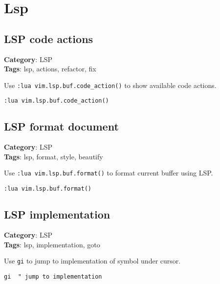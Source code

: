 {{{{{{\chapter{Lsp}
\section{LSP code actions}

\textbf{Category}: LSP\\ \textbf{Tags}: lsp, actions, refactor, fix
\vspace{0.5cm}

Use {\footnotesize \Verb§:lua vim.lsp.buf.code_action()§} to show available code actions.

\begin{Exa*}{}
\begin{Verbatim}[fontsize=\footnotesize, breaklines, breakanywhere]
:lua vim.lsp.buf.code_action()
\end{Verbatim}
\end{Exa*}

\section{LSP format document}

\textbf{Category}: LSP\\ \textbf{Tags}: lsp, format, style, beautify
\vspace{0.5cm}

Use {\footnotesize \Verb§:lua vim.lsp.buf.format()§} to format current buffer using LSP.

\begin{Exa*}{}
\begin{Verbatim}[fontsize=\footnotesize, breaklines, breakanywhere]
:lua vim.lsp.buf.format()
\end{Verbatim}
\end{Exa*}

\section{LSP implementation}

\textbf{Category}: LSP\\ \textbf{Tags}: lsp, implementation, goto
\vspace{0.5cm}

Use {\footnotesize \Verb§gi§} to jump to implementation of symbol under cursor.

\begin{Exa*}{}
\begin{Verbatim}[fontsize=\footnotesize, breaklines, breakanywhere]
gi  " jump to implementation
\end{Verbatim}
\end{Exa*}

}}}}}}

